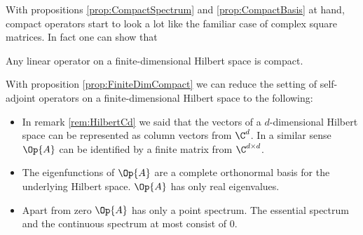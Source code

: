 With propositions \ref{prop:CompactSpectrum} and \ref{prop:CompactBasis}
at hand, compact operators start to look a lot like the familiar case
of complex square matrices.
In fact one can show that~\cite[p.~43]{Helffer2013}
\begin{prop}
	\label{prop:FiniteDimCompact}
	Any linear operator on a finite-dimensional Hilbert space is compact.
\end{prop}

\begin{rem}
With proposition \ref{prop:FiniteDimCompact}
we can reduce the setting of self-adjoint operators on a finite-dimensional
Hilbert space to the following:
\begin{itemize}
	\item In remark \vref{rem:HilbertCd} we said that the vectors
		of a $d$-dimensional Hilbert space
		can be represented as column vectors from $\C^d$.
		In a similar sense $\Op{A}$ can be identified by a finite matrix from
		$\C^{d \times d}$.
	\item The eigenfunctions of $\Op{A}$ are a complete orthonormal
		basis for the underlying Hilbert space.
		$\Op{A}$ has only real eigenvalues.
	\item Apart from zero $\Op{A}$ has only a point spectrum.
		The essential spectrum and the continuous spectrum at most consist of $0$.
\end{itemize}
\end{rem}

